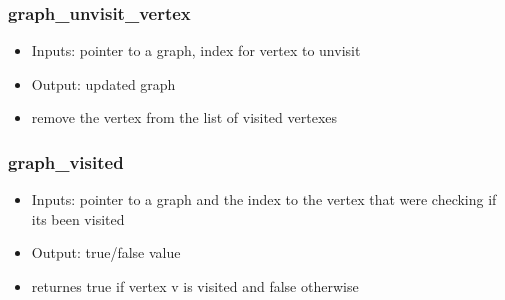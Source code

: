 \documentclass{article}
\begin{document}
\subsubsection{graph\_unvisit\_vertex}
\begin{itemize}
    \item Inputs: pointer to a graph, index for vertex to unvisit
    \item Output: updated graph
    \item remove the vertex from the list of visited vertexes 
\end{itemize}
\subsubsection{graph\_visited}
\begin{itemize}
    \item Inputs: pointer to a graph and the index to the vertex that were checking if its been visited
    \item Output: true/false value
    \item returnes true if vertex v is visited and false otherwise 
\end{itemize}


\end{document}
